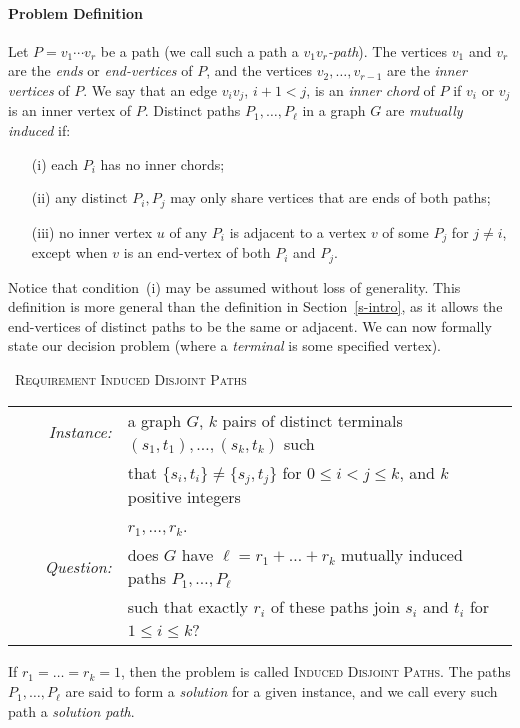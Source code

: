 \documentclass{llncs}
\newcommand{\problemIDP}{\textsc{Induced Disjoint Paths}}
\newcommand{\problemRIDP}{\textsc{Requirement Induced Disjoint Paths}}
\begin{document}
\paragraph{Problem Definition}
Let $P=v_1\cdots v_r$ be a path (we call such a path a {\em $v_1v_r$-path}).
The vertices $v_1$ and $v_r$  are the {\it ends} or {\it end-vertices} of $P$, and the vertices $v_2,\ldots,v_{r-1}$ are the \emph{inner vertices} of $P$.
We say that an edge $v_iv_j$, $i+1<j$, is an \emph{inner chord} of $P$ if $v_i$ or $v_j$ is an inner vertex of $P$.
Distinct paths $P_1,\ldots, P_{\ell}$ in a graph $G$  are {\it mutually induced} if:
\begin{itemize}
\item [(i)] each $P_i$ has no inner chords;
\item [(ii)]  any distinct $P_i,P_j$ may only share vertices that are ends of both paths;
\item [(iii)]  no inner vertex $u$ of any $P_i$ is adjacent to a vertex $v$ of some $P_j$ for $j\neq i$, except when $v$ is an end-vertex of both $P_i$ and $P_{j}$.
\end{itemize}
Notice that condition~(i) may be assumed without loss of generality. This definition is more general than the definition in Section~\ref{s-intro}, as it allows the end-vertices of distinct paths to be the same or adjacent. 
We can now formally state our decision problem (where a {\em terminal} is some specified vertex).
\begin{center}
\begin{boxedminipage}{1\textwidth}
\ \problemRIDP{}\\[3mm]
\begin{tabular}{ r l }
\textit{~~~~Instance:} & a graph $G$, 
 $k$  pairs of distinct terminals $(s_1,t_1),\ldots,(s_k,t_k)$ such\\ 
         & that $\{s_i,t_i\}\neq\{s_j,t_j\}$ for $0\leq i<j\leq k$, and $k$ positive integers\\
        & $r_1,\ldots,r_k$.\\
\textit{Question:} & does $G$ have  $\ell=r_1+\ldots+r_k$ mutually induced  paths $P_1,\ldots,P_\ell$ \\&
        such that exactly $r_i$ of these paths join $s_i$ and $t_i$ for $1\leq i\leq k$?  \\
\end{tabular}
\end{boxedminipage}
\end{center}
If $r_1=\ldots=r_k=1$, then  the problem is called \problemIDP{}. 
The paths $P_1,\ldots,P_\ell$ are said to form a {\em solution} for a given instance, and we call every such path a {\em solution path}.
\end{document}
